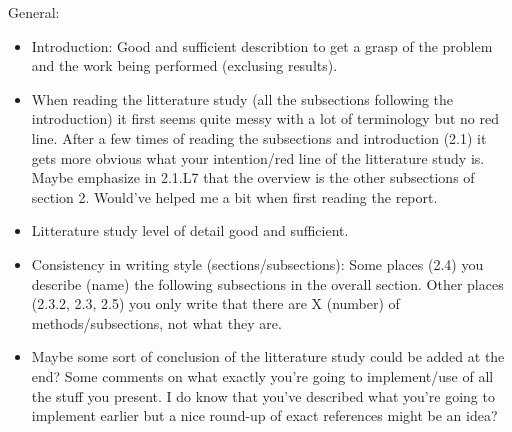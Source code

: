 \documentclass[11pt,a4paper]{article}
\begin{document}
\noindent General:
\begin{itemize}
    \item Introduction: Good and sufficient describtion to get a grasp of the
        problem and the work being performed (exclusing results).
    \item When reading the litterature study (all the subsections following the
        introduction) it first seems quite messy with a
    lot of terminology but no red line. After a few times of reading the
    subsections and introduction (2.1)
    it gets more obvious what your intention/red line of the litterature study
    is. Maybe emphasize in 2.1.L7 that the overview is the other subsections of
    section 2. Would've helped me a bit when first reading the report.
    \item Litterature study level of detail good and sufficient.
    \item Consistency in writing style (sections/subsections): Some places
    (2.4) you describe (name) the following subsections in the overall
    section. Other places (2.3.2, 2.3, 2.5) you only write that there are X
    (number) of methods/subsections, not what they are.
    \item Maybe some sort of conclusion of the litterature study could be added
        at the end? Some comments on what exactly you're going to implement/use of all
        the stuff you present. I do know that you've described what you're going
        to implement earlier but a nice round-up of exact references might be an
        idea?
\end{itemize}
\end{document}
